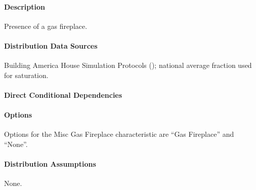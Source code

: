 \paragraph{Description}
% 
Presence of a gas fireplace.

\paragraph{Distribution Data Sources}
% 
Building America House Simulation Protocols (\cite{Wilson2014}); national average fraction used for saturation.

\paragraph{Direct Conditional Dependencies}


\paragraph{Options}
Options for the Misc Gas Fireplace characteristic are ``Gas Fireplace'' and ``None''.

\paragraph{Distribution Assumptions}
% 
None.
